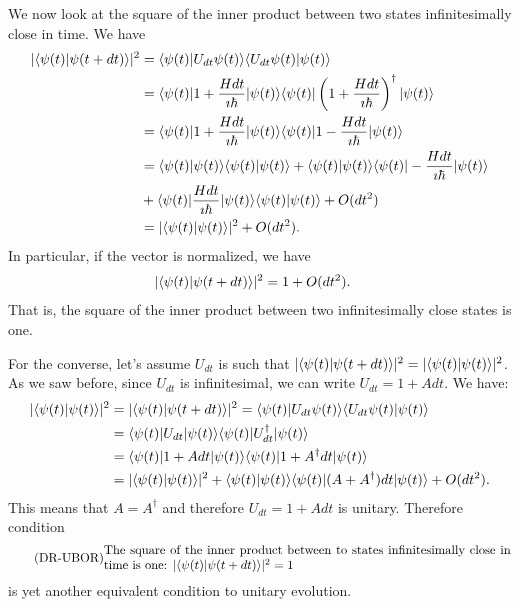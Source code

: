 We now look at the square of the inner product between two states infinitesimally close in time. We have
\begin{equation}
	\begin{aligned}
		|\langle\psi(t) | \psi(t + dt)\rangle|^2 &= \langle \psi(t) | U_{d t} \psi(t)\rangle \langle U_{d t} \psi(t) | \psi(t)\rangle \\
		&=\langle  \psi(t) | 1 + \frac{H dt}{\imath \hbar} | \psi(t)\rangle \langle\psi(t) | \left(1 + \frac{H dt}{\imath \hbar} \right)^{\dagger}| \psi(t)\rangle \\
		&=\langle  \psi(t) | 1 + \frac{H dt}{\imath \hbar} | \psi(t)\rangle \langle\psi(t) | 1 - \frac{H dt}{\imath \hbar} | \psi(t)\rangle \\
		&=\langle \psi(t) | \psi(t)\rangle \langle \psi(t) | \psi(t)\rangle + \langle  \psi(t) | \psi(t)\rangle \langle\psi(t) | - \frac{H dt}{\imath \hbar} | \psi(t)\rangle \\
		&+ \langle \psi(t) | \frac{H dt}{\imath \hbar} | \psi(t)\rangle \langle\psi(t) | \psi(t)\rangle + O(dt^2)\\
		&=|\langle\psi(t) | \psi(t)\rangle|^2 + O(dt^2).
	\end{aligned}
\end{equation}
In particular, if the vector is normalized, we have
\begin{equation}
	\begin{aligned}
		|\langle\psi(t) | \psi(t + dt)\rangle|^2 &= 1 + O(dt^2).
	\end{aligned}
\end{equation}
That is, the square of the inner product between two infinitesimally close states is one.

For the converse, let's assume $U_{dt}$ is such that $|\langle\psi(t) | \psi(t + dt)\rangle|^2 = |\langle\psi(t) | \psi(t)\rangle|^2$. As we saw before, since $U_{dt}$ is infinitesimal, we can write $U_{dt} = 1 + A dt$. We have:
\begin{equation}
	\begin{aligned}
		|\langle\psi(t) | \psi(t)\rangle|^2 &= |\langle\psi(t) | \psi(t + dt)\rangle|^2 = \langle  \psi(t) | U_{dt} \psi(t)\rangle \langle U_{dt} \psi(t) | \psi(t)\rangle \\
		&= \langle  \psi(t) | U_{dt} | \psi(t)\rangle \langle  \psi(t) | U_{dt}^{\dagger} | \psi(t)\rangle \\
		&= \langle  \psi(t) | 1 + A dt | \psi(t)\rangle \langle  \psi(t) | 1 + A^{\dagger} dt | \psi(t)\rangle \\
		&=|\langle\psi(t) | \psi(t)\rangle|^2 + \langle\psi(t) | \psi(t)\rangle \langle  \psi(t) | (A + A^{\dagger}) dt | \psi(t)\rangle + O(dt^2).
	\end{aligned}
\end{equation}
This means that $A = A^{\dagger}$ and therefore $U_{dt} = 1 + A dt$ is unitary. Therefore condition
\begin{equation}\label{rp-qm-uev-condUnitaryBorn}
	\tag{DR-UBOR}
	\eqtext{The square of the inner product between to states infinitesimally close in time is one: $|\< \psi(t) | \psi(t + dt) \> |^2 = 1$} 
\end{equation}
is yet another equivalent condition to unitary evolution.


